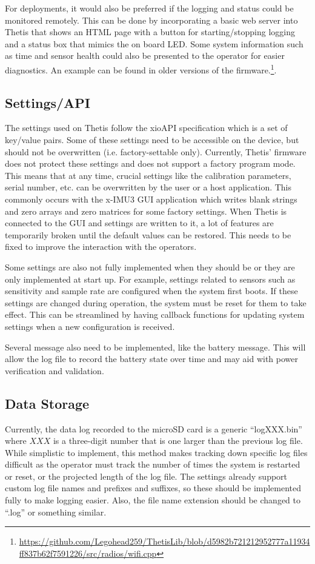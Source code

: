 For deployments, it would also be preferred if the logging and status could be monitored remotely.
This can be done by incorporating a basic web server into Thetis that shows an HTML page with a button for starting/stopping logging and a status box that mimics the on board LED.
Some system information such as time and sensor health could also be presented to the operator for easier diagnostics.
An example can be found in older versions of the firmware.\footnote{\url{https://github.com/Legohead259/ThetisLib/blob/d5982b721212952777a11934ff837b62f7591226/src/radios/wifi.cpp}}.

\subsection{Settings/API} 
The settings used on Thetis follow the xioAPI specification which is a set of key/value pairs.
Some of these settings need to be accessible on the device, but should not be overwritten (i.e. factory-settable only).
Currently, Thetis' firmware does not protect these settings and does not support a factory program mode.
This means that at any time, crucial settings like the calibration parameters, serial number, etc. can be overwritten by the user or a host application.
This commonly occurs with the x-IMU3 GUI application which writes blank strings and zero arrays and zero matrices for some factory settings.
When Thetis is connected to the GUI and settings are written to it, a lot of features are temporarily broken until the default values can be restored.
This needs to be fixed to improve the interaction with the operators.

Some settings are also not fully implemented when they should be or they are only implemented at start up.
For example, settings related to sensors such as sensitivity and sample rate are configured when the system first boots.
If these settings are changed during operation, the system must be reset for them to take effect.
This can be streamlined by having callback functions for updating system settings when a new configuration is received.

Several message also need to be implemented, like the battery message.
This will allow the log file to record the battery state over time and may aid with power verification and validation.

\subsection{Data Storage} 
Currently, the data log recorded to the microSD card is a generic ``logXXX.bin'' where $XXX$ is a three-digit number that is one larger than the previous log file.
While simplistic to implement, this method makes tracking down specific log files difficult as the operator must track the number of times the system is restarted or reset, or the projected length of the log file.
The settings already support custom log file names and prefixes and suffixes, so these should be implemented fully to make logging easier.
Also, the file name extension should be changed to ``.log'' or something similar.

